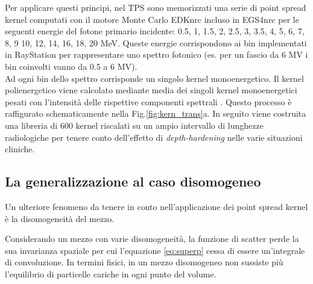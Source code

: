 {Per applicare questi principi, nel TPS sono memorizzati una serie di point spread kernel computati con il motore Monte Carlo EDKnrc incluso in EGS4nrc per le seguenti energie del fotone primario incidente: 0.5, 1, 1.5, 2, 2.5, 3, 3.5, 4, 5, 6, 7, 8, 9 10, 12, 14, 16, 18, 20 MeV. Queste energie corrispondono ai bin implementati in RayStation per rappresentare uno spettro fotonico (es. per un fascio da 6 MV i bin coinvolti vanno da 0.5 a 6 MV).\\
Ad ogni bin dello spettro corrisponde un singolo kernel monoenergetico. Il kernel polienergetico viene calcolato mediante media dei singoli kernel monoenergetici pesati con l'intensità delle rispettive componenti spettrali  \cite{Papanikolaou1993}. Questo processo è raffigurato schematicamente nella Fig.\ref{fig:kern_trans}a.
In seguito viene costruita una libreria di 600 kernel riscalati su un ampio intervallo di lunghezze radiologiche per tenere conto dell'effetto di \textit{depth-hardening} nelle varie situazioni cliniche.


\subsection{La generalizzazione al caso disomogeneo}
Un ulteriore fenomeno da tenere in conto nell'applicazione dei point spread kernel è la disomogeneità del mezzo. 

Considerando un mezzo con varie disomogeneità, la funzione di scatter perde la sua invarianza spaziale per cui l'equazione \eqref{eq:superp} cessa di essere un'integrale di convoluzione. In termini fisici, in un mezzo disomogeneo non sussiste più l'equilibrio di particelle cariche in ogni punto del volume.

}

